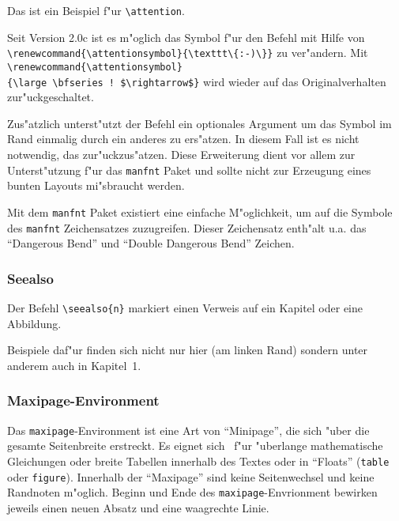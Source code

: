 \attention
Das ist ein Beispiel f"ur \verb|\attention|.

\renewcommand{\attentionsymbol}{\texttt{:-)}}
\attention
Seit Version 2.0c ist es m"oglich das Symbol f"ur den 
 Befehl mit Hilfe von 
\verb|\renewcommand{\attentionsymbol}{\texttt\{:-)\}}|
zu ver"andern. Mit 
\verb|\renewcommand{\attentionsymbol}|\\ \verb|{\large \bfseries ! $\rightarrow$}|
\renewcommand{\attentionsymbol}{\large \bfseries ! $\rightarrow$} 
wird wieder auf das Originalverhalten zur"uckgeschaltet.

Zus"atzlich unterst"utzt der  Befehl ein optionales
Argument um das Symbol im Rand einmalig durch ein anderes zu ers"atzen.
In diesem Fall ist es nicht notwendig, das 
zur"uckzus"atzen. Diese Erweiterung dient vor allem zur Unterst"utzung
f"ur das \texttt{manfnt} Paket und sollte nicht zur Erzeugung eines
bunten Layouts mi"sbraucht werden.\attention[\texttt{:-(}]

Mit dem \texttt{manfnt} Paket existiert eine einfache M"oglichkeit, um
auf die Symbole des \texttt{manfnt} Zeichensatzes zuzugreifen. Dieser
Zeichensatz enth"alt u.a. das "`Dangerous Bend"' und "`Double Dangerous
Bend"' Zeichen.

\subsubsection{Seealso}

Der Befehl \verb|\seealso{n}| markiert einen Verweis auf ein Kapitel 
oder eine Abbildung.

Beispiele daf"ur finden sich nicht nur hier (am linken Rand) 
sondern unter anderem auch in  Kapitel~1.


\subsubsection{Maxipage-Environment}

Das \texttt{maxipage}-Environment ist eine Art von "`Minipage"', die
sich "uber die gesamte Seitenbreite erstreckt. Es eignet sich \zB\
f"ur "uberlange mathematische Gleichungen oder breite Tabellen innerhalb
des Textes oder in "`Floats"' (\texttt{table} oder \texttt{figure}).
Innerhalb der "`Maxipage"' sind keine Seitenwechsel und keine Randnoten
m"oglich. Beginn und Ende des \texttt{maxipage}-Envrionment bewirken
jeweils einen neuen Absatz und eine waagrechte Linie.

